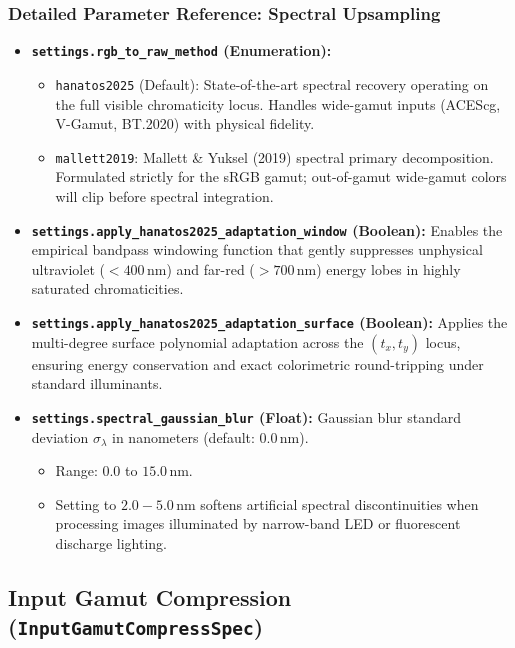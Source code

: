 \documentclass[11pt,a4paper]{article}
\begin{document}
\subsubsection{Detailed Parameter Reference: Spectral Upsampling}
\begin{itemize}[leftmargin=*]
    \item \textbf{\texttt{settings.rgb\_to\_raw\_method} (Enumeration):}
    \begin{itemize}
        \item \texttt{hanatos2025} (Default): State-of-the-art spectral recovery operating on the full visible chromaticity locus. Handles wide-gamut inputs (ACEScg, V-Gamut, BT.2020) with physical fidelity.
        \item \texttt{mallett2019}: Mallett \& Yuksel (2019) spectral primary decomposition. Formulated strictly for the sRGB gamut; out-of-gamut wide-gamut colors will clip before spectral integration.
    \end{itemize}

    \item \textbf{\texttt{settings.apply\_hanatos2025\_adaptation\_window} (Boolean):}
    Enables the empirical bandpass windowing function that gently suppresses unphysical ultraviolet ($< 400\,\text{nm}$) and far-red ($> 700\,\text{nm}$) energy lobes in highly saturated chromaticities.

    \item \textbf{\texttt{settings.apply\_hanatos2025\_adaptation\_surface} (Boolean):}
    Applies the multi-degree surface polynomial adaptation across the $(t_x, t_y)$ locus, ensuring energy conservation and exact colorimetric round-tripping under standard illuminants.

    \item \textbf{\texttt{settings.spectral\_gaussian\_blur} (Float):}
    Gaussian blur standard deviation $\sigma_\lambda$ in nanometers (default: $0.0\,\text{nm}$).
    \begin{itemize}
        \item Range: $0.0$ to $15.0\,\text{nm}$.
        \item Setting to $2.0 - 5.0\,\text{nm}$ softens artificial spectral discontinuities when processing images illuminated by narrow-band LED or fluorescent discharge lighting.
    \end{itemize}
\end{itemize}

\subsection{Input Gamut Compression (\texttt{InputGamutCompressSpec})}
\end{document}
